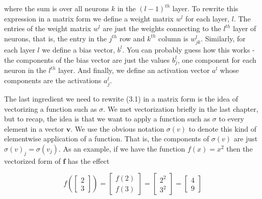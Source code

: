 \documentclass[a4paper,12pt]{report}%
\begin{document}
where the sum is over all neurons $k$ in the $(l−1)^{th}$ layer. To rewrite this expression in a matrix form we define a weight matrix $w^{l}$ for each layer, $l$. The entries of the weight matrix $w^{l}$ are just the weights connecting to the $l^{th}$ layer of neurons, that is, the entry in the $j^{th}$ row and $k^{th}$ column is $w^{l}_{jk}$. Similarly, for each layer $l$ we define a bias vector, $b^{l}$. You can probably guess how this works - the components of the bias vector are just the values $b^{l}_{j}$, one component for each neuron in the $l^{th}$ layer. And finally, we define an activation vector $a^{l}$ whose components are the activations $a^{l}_{j}$.

The last ingredient we need to rewrite (3.1) in a matrix form is the idea of vectorizing a function such as $\sigma$. We met vectorization briefly in the last chapter, but to recap, the idea is that we want to apply a function such as $\sigma$ to every element in a vector $\mathbf{v}$. We use the obvious notation $\sigma(v)$  to denote this kind of elementwise application of a function. That is, the components of $\sigma(v)$ are just $\sigma (v)_{j} = \sigma (v_{j})$. As an example, if we have the function $f(x)=x^{2}$ then the vectorized form of $\mathbf{f}$ has the effect

\begin{equation}
  f \left( \left[ \begin{array}{c} 2 \\ 3 \end{array} \right] \right) = \begin{bmatrix} f(2) \\ f(3) \end{bmatrix} = \begin{bmatrix} 2^{2} \\ 3^{2} \end{bmatrix} = \begin{bmatrix} 4 \\ 9 \end{bmatrix}
\end{equation}
\end{document}
